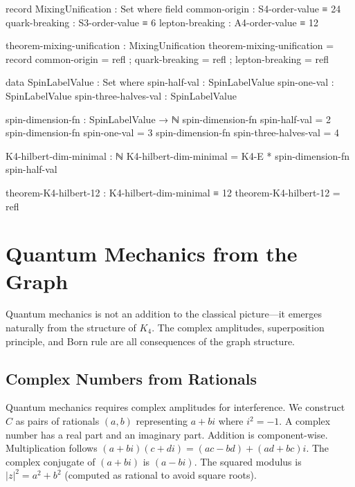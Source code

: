 \documentclass[11pt,a4paper]{book}
\def\mathbb#1{#1}%
\begin{document}
\begin{code}
record MixingUnification : Set where
  field
    common-origin    : S4-order-value ≡ 24
    quark-breaking   : S3-order-value ≡ 6
    lepton-breaking  : A4-order-value ≡ 12

theorem-mixing-unification : MixingUnification
theorem-mixing-unification = record
  { common-origin   = refl
  ; quark-breaking  = refl
  ; lepton-breaking = refl
  }
\end{code}

\begin{code}
data SpinLabelValue : Set where
  spin-half-val : SpinLabelValue
  spin-one-val : SpinLabelValue
  spin-three-halves-val : SpinLabelValue

spin-dimension-fn : SpinLabelValue → ℕ
spin-dimension-fn spin-half-val = 2
spin-dimension-fn spin-one-val = 3
spin-dimension-fn spin-three-halves-val = 4

K4-hilbert-dim-minimal : ℕ
K4-hilbert-dim-minimal = K4-E * spin-dimension-fn spin-half-val

theorem-K4-hilbert-12 : K4-hilbert-dim-minimal ≡ 12
theorem-K4-hilbert-12 = refl
\end{code}

\chapter{Quantum Mechanics from the Graph}
\label{chap:quantum-mechanics}

Quantum mechanics is not an addition to the classical picture—it emerges naturally from the structure of $K_4$. The complex amplitudes, superposition principle, and Born rule are all consequences of the graph structure.

\section{Complex Numbers from Rationals}

Quantum mechanics requires complex amplitudes for interference. We construct
$\mathbb{C}$ as pairs of rationals $(a, b)$ representing $a + bi$ where $i^2 = -1$.
A complex number has a real part and an imaginary part. Addition is component-wise. Multiplication follows $(a+bi)(c+di) = (ac-bd) + (ad+bc)i$. The complex conjugate of $(a+bi)$ is $(a-bi)$. The squared modulus is $|z|^2 = a^2 + b^2$ (computed as rational to avoid square roots).
\end{document}

